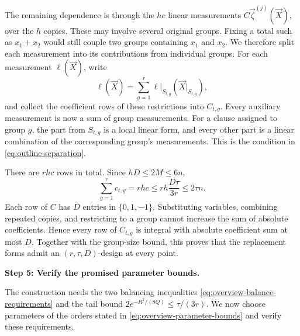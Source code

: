 \documentclass[11pt,reqno]{amsart}
\numberwithin{equation}{section}
\theoremstyle{definition}\newtheorem{definition}[theorem]{Definition}
\theoremstyle{remark}\newtheorem{remark}[theorem]{Remark}
\renewcommand{\le}{\leqslant}
\begin{document}
The remaining dependence is through the $hc$ linear measurements
$C\vec\zeta^{(j)}(\vec X)$, over the $h$ copies. These may involve
several original groups. Fixing a total such as $x_1+x_2$ would
still couple two groups containing $x_1$ and $x_2$. We therefore
split each measurement into its contributions from individual
groups. For each measurement $\ell(\vec X)$, write
\[
 \ell(\vec X)=\sum_{g=1}^r
        \ell|_{S_{t,g}}(\vec X|_{S_{t,g}}),
\]
and collect the coefficient rows of these restrictions into
$C_{t,g}$. Every auxiliary measurement is now a sum of group
measurements. For a clause assigned to group $g$, the part from
$S_{t,g}$ is a local linear form, and every other part is a linear
combination of the corresponding group's measurements.
This is the condition in \eqref{eq:outline-separation}.

There are $rhc$ rows in total. Since $hD\le2M\le6n$,
\[
 \sum_{g=1}^r c_{t,g}
 =rhc\le rh\frac{D\tau}{3r}\le2\tau n.
\]
Each row of $C$ has $D$ entries in $\{0,1,-1\}$. Substituting
variables, combining repeated copies, and restricting to a group
cannot increase the sum of absolute coefficients. Hence every
row of $C_{t,g}$ is integral with absolute coefficient sum at most
$D$. Together with the group-size bound, this proves that the
replacement forms admit an $(r,\tau,D)$-design at every point.

\medskip\noindent
\textbf{Step 5: Verify the promised parameter bounds.}\par\nobreak
\smallskip\noindent
The construction needs the two balancing inequalities
\eqref{eq:overview-balance-requirements} and the tail bound
$2e^{-R^2/(8Q)}\le\tau/(3r)$. We now choose parameters of the orders
stated in \eqref{eq:overview-parameter-bounds} and verify these requirements.
\end{document}
